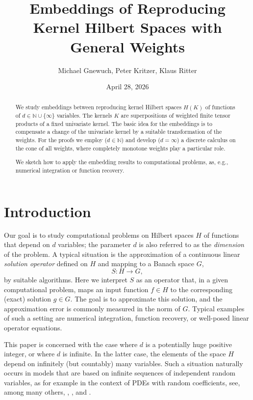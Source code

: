 \documentclass{article}
\title{Embeddings of Reproducing Kernel Hilbert Spaces 
with General Weights}
\author{Michael Gnewuch, Peter Kritzer, Klaus Ritter}
\date{April 28, 2026}
\newcommand{\N}  {{\mathbb N}}
\theoremstyle{plain}
\theoremstyle{definition}
\begin{document}
\maketitle

\begin{abstract}
We study embeddings between reproducing kernel Hilbert
spaces $H(K)$ of functions of $d \in \N \cup \{\infty\}$ variables.
The kernels $K$ are superpositions of weighted finite
tensor products of a fixed univariate kernel.
The basic idea for the embeddings
is to compensate a change of the univariate kernel 
by a suitable transformation of the weights. For the proofs
we employ ($d \in \N$) and develop ($d = \infty$) a discrete
calculus on the cone of all weights, where completely monotone
weights play a particular role.

We sketch how to apply the embedding results to 
computational problems, as, e.g., numerical integration or 
function recovery.
\end{abstract}





\section{Introduction} 

Our goal is to study computational problems on Hilbert
spaces $H$ of functions that depend on $d$ variables;
the parameter $d$ is also referred to as the \emph{dimension} of the 
problem. A typical situation is the approximation of a continuous 
linear \emph{solution operator} defined on $H$ and mapping to 
a Banach space $G$,
\[
 S \colon H \to G,
\]
by suitable algorithms. 
Here we interpret $S$ as an operator that, in a given computational 
problem, maps an input function $f\in H$ to the corresponding 
(exact)
solution $g\in G$. The goal is to approximate this solution, and the 
approximation error is commonly measured in the norm of $G$.
Typical examples of such a setting are numerical integration, 
function recovery, or well-posed linear operator equations.

This paper is concerned with the case where $d$ is a 
potentially huge positive integer, 
or where $d$ is infinite. In the latter case, the elements of the 
space $H$ depend on infinitely (but countably) many variables. 
Such a situation naturally occurs
in models that are based on infinite sequences 
of independent random variables, as for example in 
the context of
PDEs with random coefficients, see, among many others, 
\citet{CD2015},
\citet{KN16}, and \citet[Chap.~4]{ABW22}.
\end{document}
